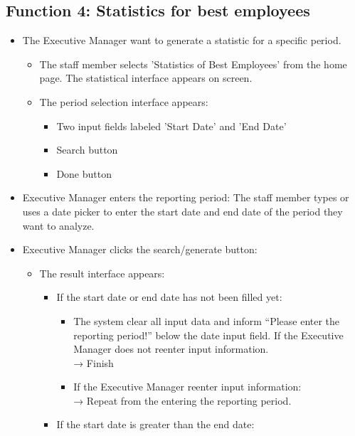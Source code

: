 \subsection{Function 4: Statistics for best employees}
\begin{itemize}
    \item The Executive Manager want to generate a statistic for a specific period.
    \begin{itemize}
        \item The staff member selects 'Statistics of Best Employees' from the home page. The statistical interface appears on screen.
        \item The period selection interface appears: 
        \begin{itemize}
            \item Two input fields labeled 'Start Date' and 'End Date'
            \item Search button
            \item Done button
        \end{itemize}
    \end{itemize}
    \item Executive Manager enters the reporting period: The staff member types or uses a date picker to enter the start date and end date of the period they want to analyze.
    \item Executive Manager clicks the search/generate button:
    \begin{itemize}
        \item The result interface appears:
        \begin{itemize}
            \item If the start date or end date has not been filled yet:
            \begin{itemize}
                \item The system clear all input data and inform  “Please enter the reporting period!” below the date input field. If the Executive Manager does not reenter input information.\\
                → Finish
                \item If the Executive Manager reenter input information:\\
                → Repeat from the entering the reporting period.
            \end{itemize}
            \item If the start date is greater than the end date:
            \begin{itemize}

\end{itemize}
\end{itemize}
\end{itemize}
\end{itemize}
